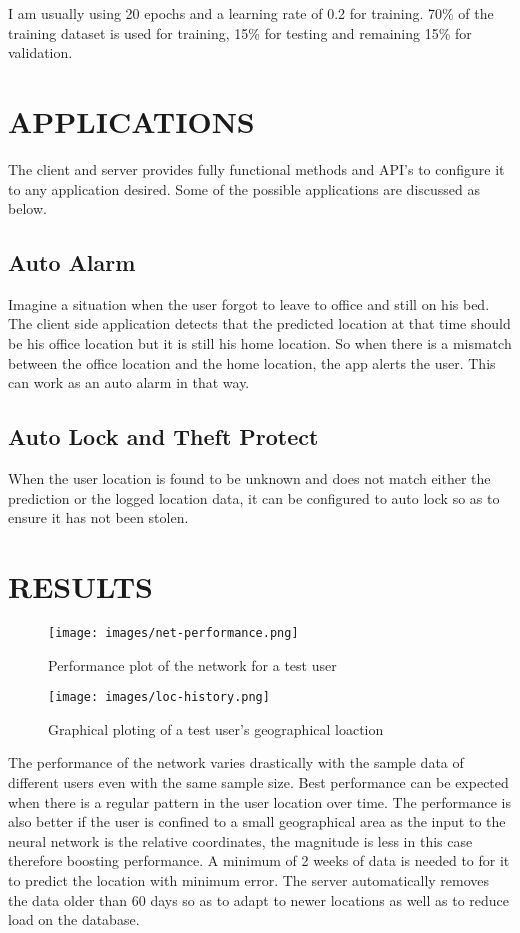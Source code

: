 \documentclass[conference]{IEEEtran}
\begin{document}
I am usually using 20 epochs and a learning rate of 0.2 for training. 70\% of the training dataset is used for training, 15\% for testing and remaining 15\% for validation.

\section{APPLICATIONS}
The client and server provides fully functional methods and API's to configure it to any application desired. Some of the possible applications are discussed as below.

\subsection{Auto Alarm}
Imagine a situation when the user forgot to leave to office and still on his bed. The client side application detects that the predicted location at that time should be his office location but it is still his home location. So when there is a mismatch between the office location and the home location, the app alerts the user. This can work as an auto alarm in that way.

\subsection{Auto Lock and Theft Protect}
When the user location is found to be unknown and does not match either the prediction or the logged location data, it can be configured to auto lock so as to ensure it has not been stolen.

\section{RESULTS}

\begin{figure}[h]
  \centering
  \texttt{[image: images/net-performance.png]}
  \caption[NETWORK PERFORMANCE]
   {Performance plot of the network for a test user}
   \label{fig:serv_net_perf}
\end{figure}

\begin{figure}[h]
  \centering
  \texttt{[image: images/loc-history.png]}
  \caption[LOCATION HISTORY]
   {Graphical ploting of a test user's geographical loaction}
   \label{fig:serv_loc_history}
\end{figure}

The performance of the network varies drastically with the sample data of different users even with the same sample size. Best performance can be expected when there is a regular pattern in the user location over time. The performance is also better if the user is confined to a small geographical area as the input to the neural network is the relative coordinates, the magnitude is less in this case therefore boosting performance. A minimum of 2 weeks of data is needed to for it to predict the location with minimum error. The server automatically removes the data older than 60 days so as to adapt to newer locations as well as to reduce load on the database.
\end{document}
